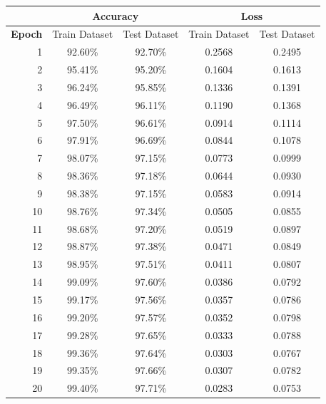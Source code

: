 \documentclass[10pt,a4paper,fullpage]{article}
\begin{document}
\vspace{-0.5cm}
\begin{center}
	\begin{tabular}{ r | c | c | c | c }
		\hline
		\multicolumn{1}{c|}{} & \multicolumn{2}{c|}{\textbf{Accuracy}} & \multicolumn{2}{c}{\textbf{Loss}}\\
		\hline
		\textbf{Epoch} & Train Dataset & Test Dataset & Train Dataset & Test Dataset\\
		\hline
		1 & 92.60\% & 92.70\% & 0.2568 & 0.2495 \\
		2 & 95.41\% & 95.20\% & 0.1604 & 0.1613 \\
		3 & 96.24\% & 95.85\% & 0.1336 & 0.1391 \\
		4 & 96.49\% & 96.11\% & 0.1190 & 0.1368 \\
		5 & 97.50\% & 96.61\% & 0.0914 & 0.1114 \\
		6 & 97.91\% & 96.69\% & 0.0844 & 0.1078 \\
		7 & 98.07\% & 97.15\% & 0.0773 & 0.0999 \\
		8 & 98.36\% & 97.18\% & 0.0644 & 0.0930 \\
		9 & 98.38\% & 97.15\% & 0.0583 & 0.0914 \\
		10 & 98.76\% & 97.34\% & 0.0505 & 0.0855 \\
		11 & 98.68\% & 97.20\% & 0.0519 & 0.0897 \\
		12 & 98.87\% & 97.38\% & 0.0471 & 0.0849 \\
		13 & 98.95\% & 97.51\% & 0.0411 & 0.0807 \\
		14 & 99.09\% & 97.60\% & 0.0386 & 0.0792 \\
		15 & 99.17\% & 97.56\% & 0.0357 & 0.0786 \\
		16 & 99.20\% & 97.57\% & 0.0352 & 0.0798 \\
		17 & 99.28\% & 97.65\% & 0.0333 & 0.0788 \\
		18 & 99.36\% & 97.64\% & 0.0303 & 0.0767 \\
		19 & 99.35\% & 97.66\% & 0.0307 & 0.0782 \\
		20 & 99.40\% & 97.71\% & 0.0283 & 0.0753 \\
		\hline
	\end{tabular}
\end{center}
\end{document}
